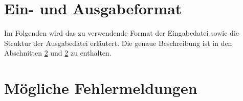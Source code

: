 \section{Ein- und Ausgabeformat}
Im Folgenden wird das zu verwendende Format der Eingabedatei sowie die Struktur der Ausgabedatei erläutert. Die genaue Beschreibung ist in den Abschnitten \ref{} und \ref{} zu enthalten.


\section{Mögliche Fehlermeldungen}





